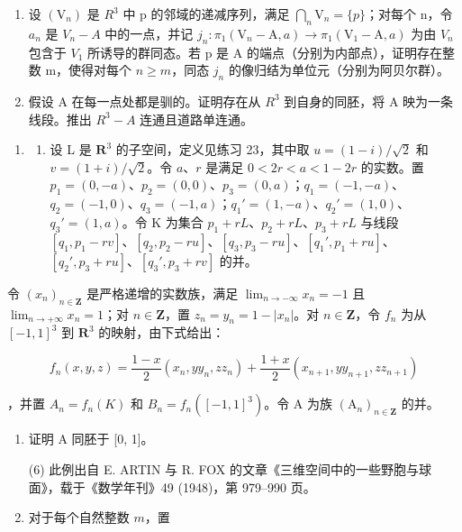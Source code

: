 \begin{enumerate}
\def\labelenumi{\alph{enumi})}
\item
  设 \((\mathrm{V}_{n})\) 是 \(R^{3}\) 中 p 的邻域的递减序列，满足 \(\bigcap_{n}\mathrm{V}_{n}=\{p\}\)；对每个 n，令 \(a_{n}\) 是 \(V_{n}-A\) 中的一点，并记 \(j_{n}\colon\pi_{1}(\mathrm{V}_{n}-\mathrm{A},a)\to\pi_{1}(\mathrm{V}_{1}-\mathrm{A},a)\) 为由 \(V_{n}\) 包含于 \(V_{1}\) 所诱导的群同态。若 p 是 A 的端点（分别为内部点），证明存在整数 m，使得对每个 \(n\geqslant m\)，同态 \(j_{n}\) 的像归结为单位元（分别为阿贝尔群）。
\item
  假设 A 在每一点处都是驯的。证明存在从 \(R^{3}\) 到自身的同胚，将 A 映为一条线段。推出 \(R^{3}-A\) 连通且道路单连通。
\end{enumerate}

\begin{enumerate}
\def\labelenumi{\arabic{enumi})}
\setcounter{enumi}{32}
\tightlist
\item
  \begin{enumerate}
  \def\labelenumii{(\arabic{enumii})}
  \setcounter{enumii}{5}
  \tightlist
  \item
     设 L 是 \(\mathbf{R}^3\) 的子空间，定义见练习 23，其中取 \(u = (1 - i)/\sqrt{2}\) 和 \(v = (1 + i)/\sqrt{2}\)。令 \(a\)、\(r\) 是满足 \(0 < 2r < a < 1 - 2r\) 的实数。置 \(p_1 = (0, -a)\)、\(p_2 = (0, 0)\)、\(p_3 = (0, a)\)；\(q_1 = (-1, -a)\)、\(q_2 = (-1, 0)\)、\(q_3 = (-1, a)\)；\(q_1' = (1, -a)\)、\(q_2' = (1, 0)\)、\(q_3' = (1, a)\)。令 K 为集合 \(p_1 + rL\)、\(p_2 + rL\)、\(p_3 + rL\) 与线段 \([q_1, p_1 - rv]\)、\([q_2, p_2 - ru]\)、\([q_3, p_3 - ru]\)、\([q_1', p_1 + ru]\)、\([q_2', p_3 + ru]\)、\([q_3', p_3 + rv]\) 的并。
  \end{enumerate}
\end{enumerate}

令 \((x_{n})_{n\in \mathbf{Z}}\) 是严格递增的实数族，满足 \(\lim_{n\to -\infty}x_n = -1\) 且 \(\lim_{n\to +\infty}x_n = 1\)；对 \(n\in \mathbf{Z}\)，置 \(z_{n} = y_{n} = 1 - |x_{n}|\)。对 \(n\in \mathbf{Z}\)，令 \(f_{n}\) 为从 \([-1,1]^{3}\) 到 \(\mathbf{R}^3\) 的映射，由下式给出：

\[
f _ {n} (x, y, z) = \frac {1 - x}{2} (x _ {n}, y y _ {n}, z z _ {n}) + \frac {1 + x}{2} (x _ {n + 1}, y y _ {n + 1}, z z _ {n + 1})
\]

，并置 \(A_{n}=f_{n}(K)\) 和 \(B_{n}=f_{n}([-1,1]^{3})\)。令 A 为族 \((\mathrm{A}_{n})_{n\in\mathbf{Z}}\) 的并。

\begin{enumerate}
\def\labelenumi{\alph{enumi})}
\item
  证明 A 同胚于 [0, 1]。

(6) 此例出自 E. ARTIN 与 R. FOX 的文章《三维空间中的一些野胞与球面》，载于《数学年刊》49 (1948)，第 979–990 页。

\item
对于每个自然整数 \(m\)，置
\end{enumerate}

